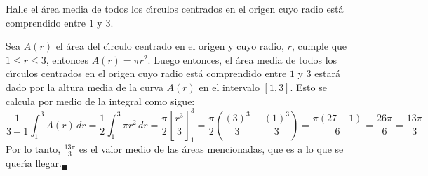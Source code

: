 \begin{enunciado}
 Halle el \'area media de todos los c\'{\i}rculos centrados en el origen cuyo radio est\'a comprendido entre $1$ y $3$.
\end{enunciado}

\begin{solucion}
 Sea $A(r)$ el \'area del c\'{\i}rculo centrado en el origen y cuyo radio, $r$, cumple que $1\leq r \leq 3$, entonces $A(r) = \pi r^2$. Luego entonces, el \'area media de todos los c\'{\i}rculos centrados en el origen cuyo radio est\'a comprendido entre $1$ y $3$ estar\'a dado por la altura media de la curva $A(r)$ en el intervalo $[1,3]$. Esto se calcula por medio de la integral como sigue:
 \begin{equation*}
  \frac{1}{3-1} \int_{1}^{3} A(r) \, dr = \frac{1}{2} \int_{1}^{3} \pi r^2 \, dr = \frac{\pi}{2} \left[ \frac{r^3}{3} \right]_{1}^{3} = \frac{\pi}{2}\left( \frac{(3)^3}{3} - \frac{(1)^3}{3}\right) = \frac{\pi(27-1)}{6} = \frac{26\pi}{6} = \frac{13\pi}{3}
 \end{equation*}
 Por lo tanto, $\displaystyle{ \frac{13\pi}{3} }$ es el valor medio de las \'areas mencionadas, que es a lo que se quer\'{\i}a llegar.${}_{\blacksquare}$
\end{solucion}
